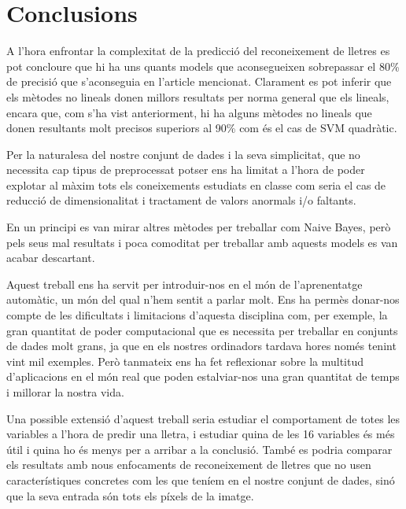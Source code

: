 \section{Conclusions}
A l'hora enfrontar la complexitat de la predicció del reconeixement de lletres es pot concloure que hi ha uns quants models que aconsegueixen sobrepassar el 80\% de precisió que s'aconseguia en l'article\cite{frey1991letter} mencionat. Clarament es pot inferir que els mètodes no lineals donen millors resultats per norma general que els lineals, encara que, com s'ha vist anteriorment, hi ha alguns mètodes no lineals que donen resultants molt precisos superiors al 90\% com és el cas de SVM quadràtic.

Per la naturalesa del nostre conjunt de dades i la seva simplicitat, que no necessita cap tipus de preprocessat potser ens ha limitat a l'hora de poder explotar al màxim tots els coneixements estudiats en classe com seria el cas de reducció de dimensionalitat i tractament de valors anormals i/o faltants.

En un principi es van mirar altres mètodes per treballar com Naive Bayes, però pels seus mal resultats i poca comoditat per treballar amb aquests models es van acabar descartant.

Aquest treball ens ha servit per introduir-nos en el món de l'aprenentatge automàtic, un món del qual n'hem sentit a parlar molt. Ens ha permès donar-nos compte de les dificultats i limitacions d'aquesta disciplina com, per exemple, la gran quantitat de poder computacional que es necessita per treballar en conjunts de dades molt grans, ja que en els nostres ordinadors tardava hores només tenint vint mil exemples. Però tanmateix ens ha fet reflexionar sobre la multitud d'aplicacions en el món real que poden estalviar-nos una gran quantitat de temps i millorar la nostra vida.

Una possible extensió d'aquest treball seria estudiar el comportament de totes les variables a l'hora de predir una lletra, i estudiar quina de les 16 variables és més útil i quina ho és menys per a arribar a la conclusió. També es podria comparar els resultats amb nous enfocaments de reconeixement de lletres que no usen característiques concretes com les que teníem en el nostre conjunt de dades, sinó que la seva entrada són tots els píxels de la imatge.